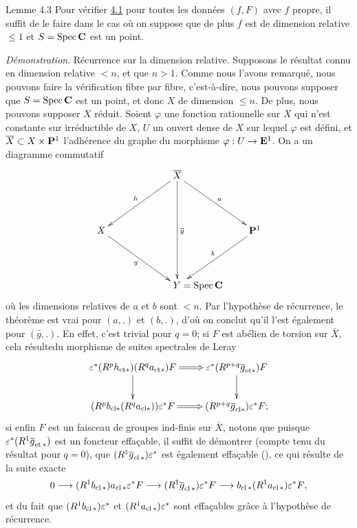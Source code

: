 \documentclass[10pt]{../fichiers-configuration-latex/smfart}
\begin{document}
\begin{enonce*}{Lemme 4.3}
Pour vérifier \hyperref[XVI.thm4.1]{4.1} pour toutes les données $(f,F)$ avec $f$ propre,
il suffit de le faire dans le cas où on suppose que de plus $f$ est de
dimension relative $\leq 1$ et $S=\Spec \CC$ est un point.
\end{enonce*}

\noindent
\emph{Démonstration}. Récurrence sur la dimension relative. Supposons
le résultat connu en dimension relative $<n$, et que $n>1$. Comme nous
l'avons remarqué, nous pouvons faire la vérification fibre par fibre,
c'est-à-dire, nous pouvons supposer que $S=\Spec \CC$ est un
point, et donc $X$ de dimension $\leq n$. De plus, nous pouvons
supposer $X$ réduit. Soient $\varphi$ une fonction rationnelle sur $X$
qui n'est constante sur  irréductible de $X$, $U$ un
ouvert dense de $X$ sur lequel $\varphi$ est défini, et
$\bar{X}\subset X\times \PP^{1}$ l'adhérence du graphe du
morphisme $\varphi:U\rightarrow \EE^{1}$. On a un diagramme
commutatif
$$
\xymatrix@R=1.5cm@C=1.5cm{
&\bar{X}\ar[ld]_{h} \ar[rd]^{a} \ar[dd]^{\bar{g}}   &\\
X  \ar[rd]_{g}  &                                  &\PP^1 \ar[ld]_{b}\\
            & **[r]Y              =\Spec \CC&
}
$$
où les dimensions relatives de $a$ et $b$ sont $<n$. Par l'hypothèse
de récurrence, le théorème est vrai pour $(a,.)$ et $(b,.)$, d'où on
conclut qu'il l'est également pour $(\bar{g},.)$. En effet, c'est
trivial pour $q=0$; si $F$ est abélien de torsion sur
$\bar{X}$, cela résulte\pageoriginale du morphisme de suites
spectrales de Leray
$$
\xymatrix{
\varepsilon^{\ast}(R^{p}h_{\text{et}\ast})(R^{q}a_{\text{et}\ast})F \ar@{=>}[r] \ar[d]&
\varepsilon^{\ast}(R^{p+q}\bar{g}_{\text{et}\ast})F  \ar[d]\\
(R^{p}b_{\text{cl}\ast}(R^{q}{a_{\text{cl}\ast}}))
\varepsilon^{\ast}F  \ar@{=>}[r] & (R^{p+q}\bar{g}_{\text{cl}\ast})\varepsilon^{\ast}F;
}
$$
si enfin $F$ est un faisceau de groupes ind-finis sur $\bar{X}$,
notons que puisque $\epsilon^{\ast}(R^{1}\bar{g}_{\text{\rm
et\,}\ast})$ est un foncteur effaçable, il suffit de démontrer
(compte tenu du résultat pour $q=0$), que
$(R^{1}\bar{g}_{\cl\ast})\epsilon^{\ast}$ est également effaçable
(\cf {}), ce qui résulte de la suite exacte
$$
0\longrightarrow (R^{1}b_{\cl\ast})a_{\cl
\ast}\epsilon^{\ast}F\longrightarrow (R^{1}\bar{g}_{\cl
\ast})\epsilon^{\ast}F\longrightarrow b_{\cl \ast}(R^{1}a_{\cl
\ast})\epsilon^{\ast}F{\quoi},
$$
et du fait que $(R^{1}b_{\cl\ast})\epsilon^{\ast}$ et
$(R^{1}a_{\cl\ast})\epsilon^{\ast}$ sont effaçables grâce à
l'hypothèse de récurrence.
\end{document}
